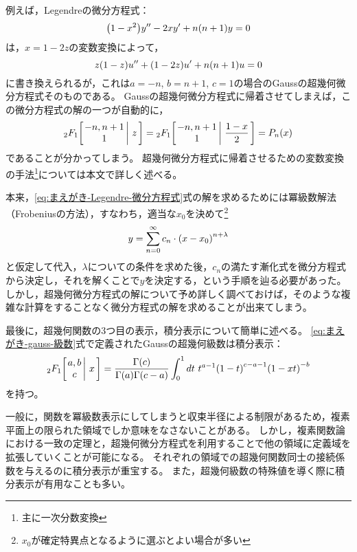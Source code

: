 \documentclass[a4paper,draft]{ltjsarticle}
\begin{document}
例えば，Legendreの微分方程式：
\begin{equation}
    \label{eq:まえがき-Legendre-微分方程式}
    \pare{1-x^2}y''-2xy'+n\pare{n+1}y=0
\end{equation}
は，$x=1-2z$の変数変換によって，
\begin{equation}
    z\pare{1-z}u''+\pare{1-2z}u'+n\pare{n+1}u=0
\end{equation}
に書き換えられるが，これは$a=-n$, $b=n+1$, $c=1$の場合のGaussの超幾何微分方程式そのものである。
Gaussの超幾何微分方程式に帰着させてしまえば，この微分方程式の解の一つが自動的に，
\begin{equation}
    \Gauss{-n}{n+1}{1}{z}=\Gauss{-n}{n+1}{1}{\frac{1-x}{2}}=\fun{P_n}{x}
\end{equation}
であることが分かってしまう。
超幾何微分方程式に帰着させるための変数変換の手法\footnote{主に一次分数変換}については本文で詳しく述べる。

本来，\eqref{eq:まえがき-Legendre-微分方程式}式の解を求めるためには冪級数解法（Frobeniusの方法），すなわち，適当な$x_0$を決めて\footnote{$x_0$が確定特異点となるように選ぶとよい場合が多い}
\begin{equation}
    y=\sum_{n=0}^\infty c_n \cdot \pare{x-x_0}^{n+\lambda}
\end{equation}
と仮定して代入，$\lambda$についての条件を求めた後，$c_n$の満たす漸化式を微分方程式から決定し，それを解くことで$y$を決定する，という手順を辿る必要があった。
しかし，超幾何微分方程式の解について予め詳しく調べておけば，そのような複雑な計算をすることなく微分方程式の解を求めることが出来てしまう。

最後に，超幾何関数の3つ目の表示，積分表示について簡単に述べる。
\eqref{eq:まえがき-gauss-級数}式で定義されたGaussの超幾何級数は積分表示：
\begin{equation}
    \Gauss{a}{b}{c}{x}
    = \dfrac{\fun{\Gamma}{c}}{\fun{\Gamma}{a}\fun{\Gamma}{c-a}}
    \int_0^1 dt \ t^{a-1}\pare{1 - t}^{c-a-1} \pare{1-xt}^{-b}
    \label{eq:まえがき-gauss-積分}
\end{equation}
を持つ。

一般に，関数を冪級数表示にしてしまうと収束半径による制限があるため，複素平面上の限られた領域でしか意味をなさないことがある。
しかし，複素関数論における一致の定理と，超幾何微分方程式を利用することで他の領域に定義域を拡張していくことが可能になる。
それぞれの領域での超幾何関数同士の接続係数を与えるのに積分表示が重宝する。
また，超幾何級数の特殊値を導く際に積分表示が有用なことも多い。
\end{document}
